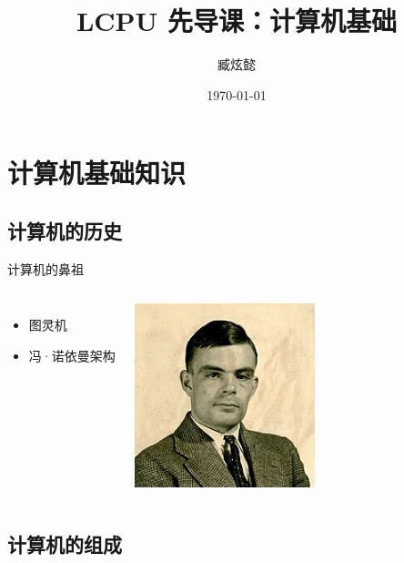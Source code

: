 \documentclass{beamer}
\title{LCPU 先导课：计算机基础}
\author{臧炫懿}
\institute{北京大学 信息科学技术学院}
\date{\today}
\begin{document}
\frame{\titlepage}

\section{计算机基础知识}

\subsection{计算机的历史}
\begin{frame}{计算机的鼻祖}
    \begin{columns}[T]
            \begin{itemize}
                \item <1->图灵机
                \item <2->冯·诺依曼架构
            \end{itemize}

            \includegraphics[width=0.9\textwidth]{1-1-Turing.jpg}
    \end{columns}
\end{frame}

\subsection{计算机的组成}
\end{document}
